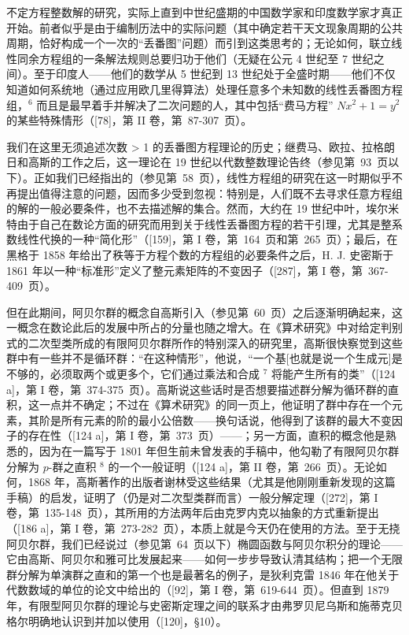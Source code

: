 不定方程整数解的研究，实际上直到中世纪盛期的中国数学家和印度数学家才真正开始。前者似乎是由于编制历法中的实际问题（其中确定若干天文现象周期的公共周期，恰好构成一个一次的“丢番图”问题）而引到这类思考的；无论如何，联立线性同余方程组的一条解法规则总要归功于他们（无疑在公元 4 世纪至 7 世纪之间）。至于印度人——他们的数学从 5 世纪到 13 世纪处于全盛时期——他们不仅知道如何系统地（通过应用欧几里得算法）处理任意多个未知数的线性丢番图方程组，\(^{6}\) 而且是最早着手并解决了二次问题的人，其中包括“费马方程” \(Nx^{2} + 1 = y^{2}\) 的某些特殊情形（{[}78{]}，第 II 卷，第~87-307~页）。

我们在这里无须追述次数 \textgreater{} 1 的丢番图方程理论的历史；继费马、欧拉、拉格朗日和高斯的工作之后，这一理论在 19 世纪以代数整数理论告终（参见第~93~页以下）。正如我们已经指出的（参见第~58~页），线性方程组的研究在这一时期似乎不再提出值得注意的问题，因而多少受到忽视：特别是，人们既不去寻求任意方程组的解的一般必要条件，也不去描述解的集合。然而，大约在 19 世纪中叶，埃尔米特由于自己在数论方面的研究而用到关于线性丢番图方程的若干引理，尤其是整系数线性代换的一种“简化形”（{[}159{]}，第 I 卷，第~164~页和第~265~页）；最后，在黑格于 1858 年给出了秩等于方程个数的方程组的必要条件之后，H. J. 史密斯于 1861 年以一种“标准形”定义了整元素矩阵的不变因子（{[}287{]}，第 I 卷，第~367-409~页）。

但在此期间，阿贝尔群的概念自高斯引入（参见第~60~页）之后逐渐明确起来，这一概念在数论此后的发展中所占的分量也随之增大。在《算术研究》中对给定判别式的二次型类所成的有限阿贝尔群所作的特别深入的研究里，高斯很快察觉到这些群中有一些并不是循环群：“在这种情形”，他说，“一个基{[}也就是说一个生成元{]}是不够的，必须取两个或更多个，它们通过乘法和合成 \(^{7}\) 将能产生所有的类”（{[}124 a{]}，第 I 卷，第~374-375~页）。高斯说这些话时是否想要描述群分解为循环群的直积，这一点并不确定；不过在《算术研究》的同一页上，他证明了群中存在一个元素，其阶是所有元素的阶的最小公倍数——换句话说，他得到了该群的最大不变因子的存在性（{[}124 a{]}，第 I 卷，第~373~页）——；另一方面，直积的概念他是熟悉的，因为在一篇写于 1801 年但生前未曾发表的手稿中，他勾勒了有限阿贝尔群分解为 \(p\)-群之直积 \(^{8}\) 的一个一般证明（{[}124 a{]}，第 II 卷，第~266~页）。无论如何，1868 年，高斯著作的出版者谢林受这些结果（尤其是他刚刚重新发现的这篇手稿）的启发，证明了（仍是对二次型类群而言）一般分解定理（{[}272{]}，第 I 卷，第~135-148~页），其所用的方法两年后由克罗内克以抽象的方式重新提出（{[}186 a{]}，第 I 卷，第~273-282~页），本质上就是今天仍在使用的方法。至于无挠阿贝尔群，我们已经说过（参见第~64~页以下）椭圆函数与阿贝尔积分的理论——它由高斯、阿贝尔和雅可比发展起来——如何一步步导致认清其结构；把一个无限群分解为单演群之直和的第一个也是最著名的例子，是狄利克雷 1846 年在他关于代数数域的单位的论文中给出的（{[}92{]}，第 I 卷，第~619-644~页）。但直到 1879 年，有限型阿贝尔群的理论与史密斯定理之间的联系才由弗罗贝尼乌斯和施蒂克贝格尔明确地认识到并加以使用（{[}120{]}，§10）。

